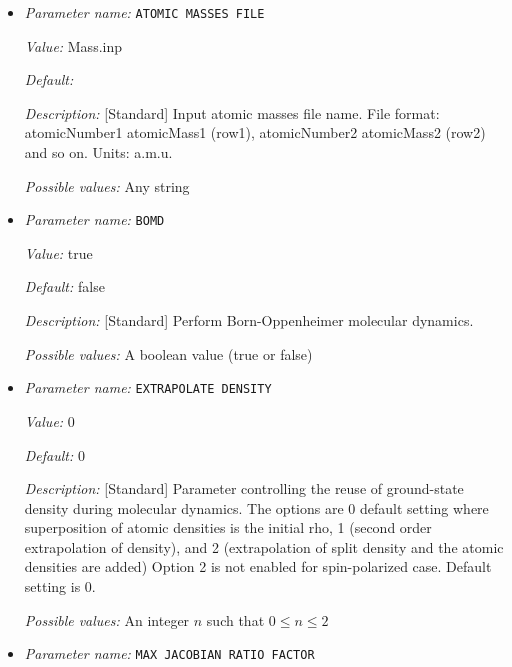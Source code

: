 \begin{itemize}
\item {\it Parameter name:} {\tt ATOMIC MASSES FILE}
\label{parameters:Molecular Dynamics/ATOMIC MASSES FILE}
\label{parameters:Molecular_20Dynamics/ATOMIC_20MASSES_20FILE}


{\it Value:} Mass.inp


{\it Default:} 


{\it Description:} [Standard] Input atomic masses file name. File format: atomicNumber1 atomicMass1 (row1), atomicNumber2 atomicMass2 (row2) and so on. Units: a.m.u.


{\it Possible values:} Any string
\item {\it Parameter name:} {\tt BOMD}
\label{parameters:Molecular Dynamics/BOMD}
\label{parameters:Molecular_20Dynamics/BOMD}


{\it Value:} true


{\it Default:} false


{\it Description:} [Standard] Perform Born-Oppenheimer molecular dynamics.


{\it Possible values:} A boolean value (true or false)
\item {\it Parameter name:} {\tt EXTRAPOLATE DENSITY}
\label{parameters:Molecular Dynamics/EXTRAPOLATE DENSITY}
\label{parameters:Molecular_20Dynamics/EXTRAPOLATE_20DENSITY}


{\it Value:} 0


{\it Default:} 0


{\it Description:} [Standard] Parameter controlling the reuse of ground-state density during molecular dynamics. The options are 0 default setting where superposition of atomic densities is the initial rho, 1 (second order extrapolation of density), and 2 (extrapolation of split density and the atomic densities are added) Option 2 is not enabled for spin-polarized case. Default setting is 0.


{\it Possible values:} An integer $n$ such that $0\leq n \leq 2$
\item {\it Parameter name:} {\tt MAX JACOBIAN RATIO FACTOR}
\label{parameters:Molecular Dynamics/MAX JACOBIAN RATIO FACTOR}
\label{parameters:Molecular_20Dynamics/MAX_20JACOBIAN_20RATIO_20FACTOR}



\end{itemize}
